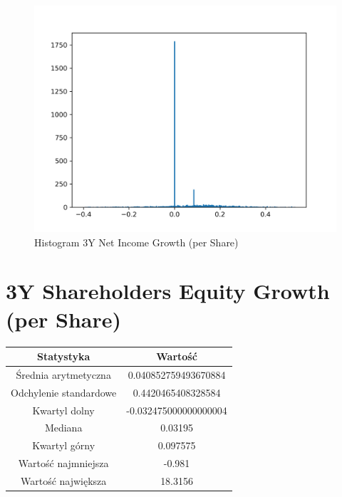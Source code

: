 \documentclass{article}
\begin{document}
\begin{figure}[h!]
    \includegraphics[width=\linewidth]{variables/3Y Net Income Growth (per Share).png}
    \caption{Histogram 3Y Net Income Growth (per Share) }
\end{figure}\section{ 3Y Shareholders Equity Growth (per Share) }

\begin{center}
    \begin{tabular}{|c | c|} 
    \hline
    Statystyka & Wartość \\
    \hline\hline
    Średnia arytmetyczna & 0.040852759493670884 \\ 
    \hline
    Odchylenie standardowe & 0.4420465408328584 \\
    \hline
    Kwartyl dolny & -0.032475000000000004 \\
    \hline
    Mediana & 0.03195 \\
    \hline
    Kwartyl górny & 0.097575 \\
    \hline
    Wartość najmniejsza & -0.981 \\
    \hline
    Wartość największa & 18.3156 \\
    \hline
   \end{tabular}
\end{center}
\end{document}
